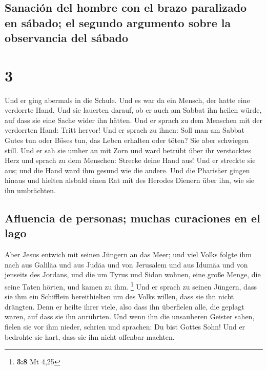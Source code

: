 \hypertarget{sanaciuxf3n-del-hombre-con-el-brazo-paralizado-en-suxe1bado-el-segundo-argumento-sobre-la-observancia-del-suxe1bado}{%
\subsection{Sanación del hombre con el brazo paralizado en sábado; el
segundo argumento sobre la observancia del
sábado}\label{sanaciuxf3n-del-hombre-con-el-brazo-paralizado-en-suxe1bado-el-segundo-argumento-sobre-la-observancia-del-suxe1bado}}

\hypertarget{section-2}{%
\section{3}\label{section-2}}

 Und er ging abermals in die Schule. Und es war da ein
Mensch, der hatte eine verdorrte Hand.  Und sie lauerten
darauf, ob er auch am Sabbat ihn heilen würde, auf dass sie eine Sache
wider ihn hätten.  Und er sprach zu dem Menschen mit der
verdorrten Hand: Tritt hervor!  Und er sprach zu ihnen:
Soll man am Sabbat Gutes tun oder Böses tun, das Leben erhalten oder
töten? Sie aber schwiegen still.  Und er sah sie umher an
mit Zorn und ward betrübt über ihr verstocktes Herz und sprach zu dem
Menschen: Strecke deine Hand aus! Und er streckte sie aus; und die Hand
ward ihm gesund wie die andere.  Und die Pharisäer gingen
hinaus und hielten alsbald einen Rat mit des Herodes Dienern über ihn,
wie sie ihn umbrächten.

\hypertarget{afluencia-de-personas-muchas-curaciones-en-el-lago}{%
\subsection{Afluencia de personas; muchas curaciones en el
lago}\label{afluencia-de-personas-muchas-curaciones-en-el-lago}}

 Aber Jesus entwich mit seinen Jüngern an das Meer; und
viel Volks folgte ihm nach aus Galiläa und aus Judäa  und
von Jerusalem und aus Idumäa und von jenseits des Jordans, und die um
Tyrus und Sidon wohnen, eine große Menge, die seine Taten hörten, und
kamen zu ihm. \footnote{\textbf{3:8} Mt 4,25}  Und er
sprach zu seinen Jüngern, dass sie ihm ein Schifflein bereithielten um
des Volks willen, dass sie ihn nicht drängten.  Denn er
heilte ihrer viele, also dass ihn überfielen alle, die geplagt waren,
auf dass sie ihn anrührten.  Und wenn ihn die unsauberen
Geister sahen, fielen sie vor ihm nieder, schrien und sprachen: Du bist
Gottes Sohn!  Und er bedrohte sie hart, dass sie ihn
nicht offenbar machten.

